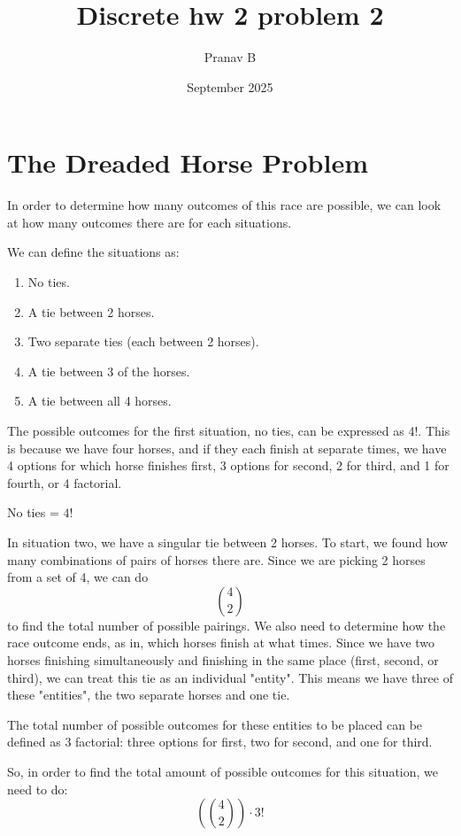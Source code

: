 \documentclass{article}
\title{Discrete hw 2 problem 2}
\author{Pranav B}
\date{September 2025}
\begin{document}
\maketitle

\section{The Dreaded Horse Problem}

In order to determine how many outcomes of this race are possible, we can look at how many outcomes there are for each situations. 

We can define the situations as:


\begin{enumerate}
    \item No ties.
    \item A tie between 2 horses.
    \item Two separate ties (each between 2 horses).
    \item A tie between 3 of the horses.
    \item A tie between all 4 horses.
\end{enumerate}

The possible outcomes for the first situation, no ties, can be expressed as 4!. This is because we have four horses, and if they each finish at separate times, we have 4 options for which horse finishes first, 3 options for second, 2 for third, and 1 for fourth, or 4 factorial.

\begin{center}
No ties = $4!$
\end{center}

In situation two, we have a singular tie between 2 horses. To start, we found how many combinations of pairs of horses there are. Since we are picking 2 horses from a set of 4, we can do \[
{4} \choose{2}
\] to find the total number of possible pairings. We also need to determine how the race outcome ends, as in, which horses finish at what times. Since we have two horses finishing simultaneously and finishing in the same place (first, second, or third), we can treat this tie as an individual "entity". This means we have three of these "entities", the two separate horses and one tie. 

The total number of possible outcomes for these entities to be placed can be defined as 3 factorial: three options for first, two for second, and one for third. 

So, in order to find the total amount of possible outcomes for this situation,  we need to do: 
\[
\left(4\choose2\right) \cdot 3!
\]
\end{document}
